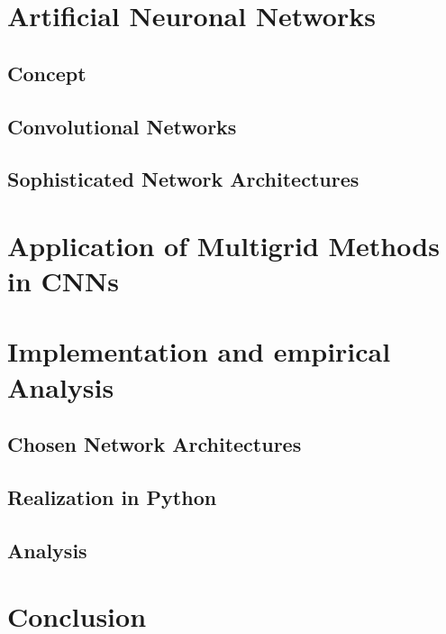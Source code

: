 \documentclass[a4paper,12pt,titlepage,enabledeprecatedfontcommands]{scrreprt}
\begin{document}
\chapter{Artificial Neuronal Networks}
\section{Concept}
\section{Convolutional Networks}
\section{Sophisticated Network Architectures}
\chapter{Application of Multigrid Methods in CNNs}
\chapter{Implementation and empirical Analysis}
\section{Chosen Network Architectures}
\section{Realization in Python}
\section{Analysis}
\chapter{Conclusion}


 \label{bibtex}
\end{document}
